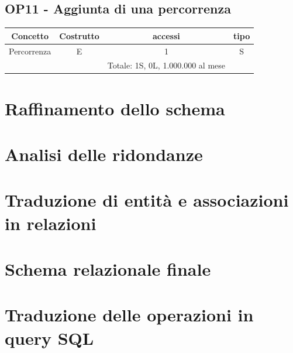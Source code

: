     \subsection*{OP11 - Aggiunta di una percorrenza}
    \begin{table}[H]
    \centering
    \begin{tabular}{|c|c|c|c|}
    \hline
    \rowcolor{green!70!black!80}
    \textbf{Concetto} & \textbf{Costrutto} & \textbf{accessi} & \textbf{tipo}\\
    \hline
    Percorrenza & E & 1 & S \\\
    & & Totale: 1S, 0L, 1.000.000 al mese &\\
    \hline
    \end{tabular}
    \end{table}
  
\section{Raffinamento dello schema}
\section{Analisi delle ridondanze}
\section{Traduzione di entità e associazioni in relazioni}
\section{Schema relazionale finale}
\section{Traduzione delle operazioni in query SQL}